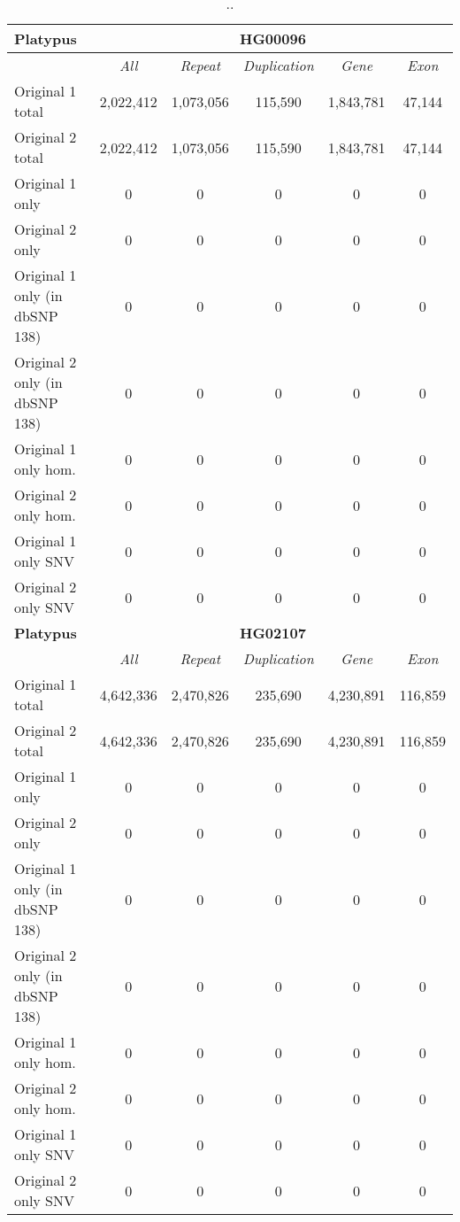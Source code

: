 \begin{table}[htb]
\caption{ .. }
\begin{center}
\begin{tabular}{|l|c||c|c|c|c|}
\hline
{\bf Platypus} & \multicolumn{5}{|c|}{\bf HG00096} \\
\hline
\cline{2-6}
{\bf} & {\it All} & {\it Repeat} & {\it Duplication} & {\it Gene} & {\it Exon} \\
\hline
Original 1 total & 2,022,412 & 1,073,056 & 115,590 & 1,843,781 & 47,144 \\
\hline
Original 2 total & 2,022,412 & 1,073,056 & 115,590 & 1,843,781 & 47,144 \\
\hline
Original 1 only & 0 & 0 & 0 & 0 & 0\\ 
\hline
Original 2 only & 0 & 0 & 0 & 0 & 0\\ 
\hline
Original 1 only (in dbSNP 138) & 0 & 0 & 0 & 0 & 0\\ 
\hline
Original 2 only (in dbSNP 138) & 0 & 0 & 0 & 0 & 0\\ 
\hline
Original 1 only hom. & 0 & 0 & 0 & 0 & 0\\ 
\hline
Original 2 only hom. & 0 & 0 & 0 & 0 & 0\\ 
\hline
Original 1 only SNV & 0 & 0 & 0 & 0 & 0\\ 
\hline
Original 2 only SNV & 0 & 0 & 0 & 0 & 0\\ 
\hline
\hline
{\bf Platypus} & \multicolumn{5}{|c|}{\bf HG02107} \\
\hline
\cline{2-6}
{\bf} & {\it All} & {\it Repeat} & {\it Duplication} & {\it Gene} & {\it Exon} \\
\hline
Original 1 total & 4,642,336 & 2,470,826 & 235,690 & 4,230,891 & 116,859 \\
\hline
Original 2 total & 4,642,336 & 2,470,826 & 235,690 & 4,230,891 & 116,859 \\
\hline
Original 1 only & 0 & 0 & 0 & 0 & 0\\ 
\hline
Original 2 only & 0 & 0 & 0 & 0 & 0\\ 
\hline
Original 1 only (in dbSNP 138) & 0 & 0 & 0 & 0 & 0\\ 
\hline
Original 2 only (in dbSNP 138) & 0 & 0 & 0 & 0 & 0\\ 
\hline
Original 1 only hom. & 0 & 0 & 0 & 0 & 0\\ 
\hline
Original 2 only hom. & 0 & 0 & 0 & 0 & 0\\ 
\hline
Original 1 only SNV & 0 & 0 & 0 & 0 & 0\\ 
\hline
Original 2 only SNV & 0 & 0 & 0 & 0 & 0\\ 
\hline
\end{tabular}
\end{center}
\label{tab:orig-vs-orig2-platypus}
\end{table}

